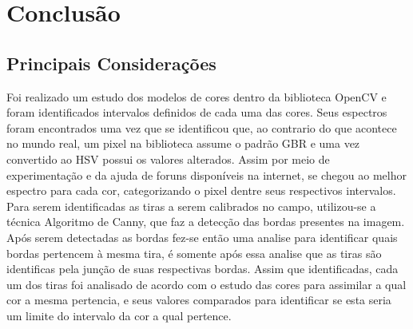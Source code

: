 
\chapter{Conclusão} \label{Cap:Conclusao}

\section{Principais Considerações}
	Foi realizado um estudo dos modelos de cores dentro da biblioteca OpenCV e foram identificados intervalos definidos de cada uma das cores. Seus espectros foram encontrados uma vez que se identificou que, ao contrario do que acontece no mundo real, um pixel na biblioteca assume o  padrão GBR e uma vez convertido ao HSV possui os valores alterados. Assim por meio de experimentação e da ajuda de foruns  disponíveis na internet, se chegou ao melhor espectro para cada cor, categorizando o pixel dentre seus respectivos intervalos. Para serem identificadas as tiras a serem calibrados no campo, utilizou-se a técnica Algoritmo de Canny, que faz a detecção das bordas presentes na imagem. Após serem detectadas as bordas fez-se então uma analise para identificar quais bordas pertencem à mesma tira, é somente após essa analise que as tiras são identificas pela junção de suas respectivas bordas. Assim que identificadas, cada um dos tiras foi analisado de acordo com o estudo das cores para assimilar a qual cor a mesma pertencia, e seus valores comparados para identificar se esta seria um limite do intervalo da cor a qual pertence.

